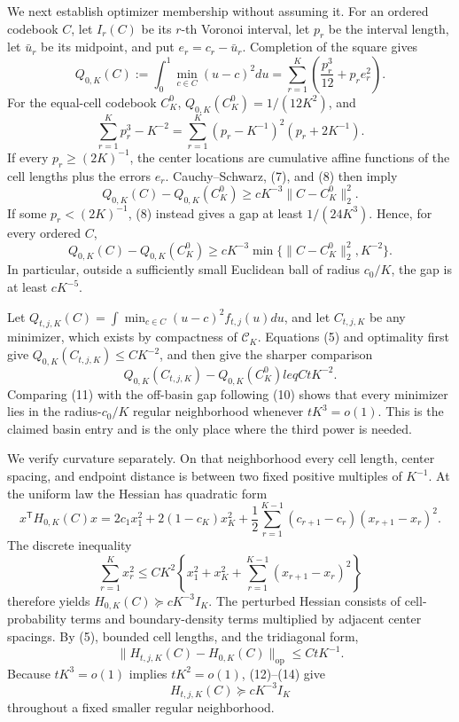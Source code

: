 We next establish optimizer membership without assuming it.  For an ordered codebook \(C\), let \(I_r(C)\) be its \(r\)-th Voronoi interval, let \(p_r\) be the interval length, let \(\bar u_r\) be its midpoint, and put \(e_r=c_r-\bar u_r\).  Completion of the square gives
\[
 Q_{0,K}(C):=\int_0^1\min_{c\in C}(u-c)^2du
 =\sum_{r=1}^K\left(\frac{p_r^3}{12}+p_re_r^2\right).                                    \tag{7}
\]
For the equal-cell codebook \(C_K^0\), \(Q_{0,K}(C_K^0)=1/(12K^2)\), and
\[
 \sum_{r=1}^Kp_r^3-K^{-2}
 =\sum_{r=1}^K(p_r-K^{-1})^2(p_r+2K^{-1}).                                                \tag{8}
\]
If every \(p_r\geq(2K)^{-1}\), the center locations are cumulative affine functions of the cell lengths plus the errors \(e_r\).  Cauchy--Schwarz, (7), and (8) then imply
\[
 Q_{0,K}(C)-Q_{0,K}(C_K^0)\geq cK^{-3}\|C-C_K^0\|_2^2.                                 \tag{9}
\]
If some \(p_r<(2K)^{-1}\), (8) instead gives a gap at least \(1/(24K^3)\).  Hence, for every ordered \(C\),
\[
 Q_{0,K}(C)-Q_{0,K}(C_K^0)
 \geq cK^{-3}\min\{\|C-C_K^0\|_2^2,K^{-2}\}.                                         \tag{10}
\]
In particular, outside a sufficiently small Euclidean ball of radius \(c_0/K\), the gap is at least \(cK^{-5}\).

Let \(Q_{t,j,K}(C)=\int\min_{c\in C}(u-c)^2f_{t,j}(u)du\), and let \(C_{t,j,K}\) be any minimizer, which exists by compactness of \(\mathcal C_K\).  Equations (5) and optimality first give \(Q_{0,K}(C_{t,j,K})\leq C K^{-2}\), and then give the sharper comparison
\[
 Q_{0,K}(C_{t,j,K})-Q_{0,K}(C_K^0)leq CtK^{-2}.                                         \tag{11}
\]
Comparing (11) with the off-basin gap following (10) shows that every minimizer lies in the radius-\(c_0/K\) regular neighborhood whenever \(tK^3=o(1)\).  This is the claimed basin entry and is the only place where the third power is needed.

We verify curvature separately.  On that neighborhood every cell length, center spacing, and endpoint distance is between two fixed positive multiples of \(K^{-1}\).  At the uniform law the Hessian has quadratic form
\[
 x^{\mathsf T}H_{0,K}(C)x
 =2c_1x_1^2+2(1-c_K)x_K^2
 +\frac12\sum_{r=1}^{K-1}(c_{r+1}-c_r)(x_{r+1}-x_r)^2.                                  \tag{12}
\]
The discrete inequality
\[
 \sum_{r=1}^Kx_r^2\leq CK^2\left\{x_1^2+x_K^2+
 \sum_{r=1}^{K-1}(x_{r+1}-x_r)^2\right\}                                                \tag{13}
\]
therefore yields \(H_{0,K}(C)\succeq cK^{-3}I_K\).  The perturbed Hessian consists of cell-probability terms and boundary-density terms multiplied by adjacent center spacings.  By (5), bounded cell lengths, and the tridiagonal form,
\[
 \|H_{t,j,K}(C)-H_{0,K}(C)\|_{\mathrm{op}}\leq CtK^{-1}.                               \tag{14}
\]
Because \(tK^3=o(1)\) implies \(tK^2=o(1)\), (12)--(14) give
\[
 H_{t,j,K}(C)\succeq cK^{-3}I_K                                                        \tag{15}
\]
throughout a fixed smaller regular neighborhood.

